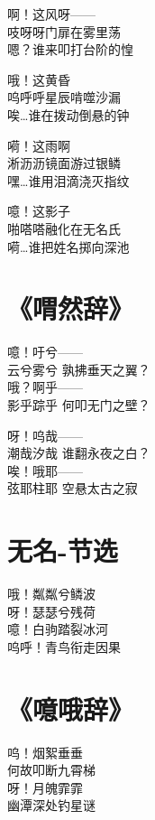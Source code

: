 啊！这风呀—— \\
吱呀呀门扉在雾里荡 \\
嗯？谁来叩打台阶的惶
\vspace{1em}

哦！这黄昏 \\
呜呼呼星辰啃噬沙漏 \\
唉…谁在拨动倒悬的钟
\vspace{1em}

嗬！这雨啊 \\
淅沥沥镜面游过银鳞 \\
嘿…谁用泪滴浇灭指纹
\vspace{1em}

噫！这影子 \\
啪嗒嗒融化在无名氏 \\
嗬…谁把姓名掷向深池

\clearpage


\section{《喟然辞》}

噫！吁兮—— \\
云兮雾兮 孰拂垂天之翼？ \\
哦？啊乎—— \\
影乎踪乎 何叩无门之壁？
\vspace{1em}

呀！呜哉—— \\
潮哉汐哉 谁翻永夜之白？ \\
唉！哦耶—— \\
弦耶柱耶 空悬太古之寂

\clearpage


\section{无名-节选}

哦！粼粼兮鳞波 \\
呀！瑟瑟兮残荷 \\
噫！白驹踏裂冰河 \\
呜呼！青鸟衔走因果

\clearpage


\section{《噫哦辞》}

呜！烟絮垂垂 \\
何故叩断九霄梯 \\
呀！月魄霏霏 \\
幽潭深处钓星谜
\vspace{1em}

